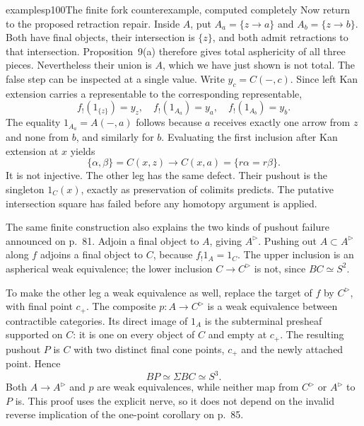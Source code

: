 \begin{dcomment}{examples}{p100}{The finite fork counterexample, computed completely}
Now return to the proposed retraction repair. Inside $A$, put $A_a=\{z\to a\}$ and $A_b=\{z\to b\}$. Both have final objects, their intersection is $\{z\}$, and both admit retractions to that intersection. Proposition~9(a) therefore gives total asphericity of all three pieces. Nevertheless their union is $A$, which we have just shown is not total. The false step can be inspected at a single value. Write $y_c=C(-,c)$. Since left Kan extension carries a representable to the corresponding representable,
\[
f_!(1_{\{z\}})=y_z,\quad
f_!(1_{A_a})=y_a,\quad
f_!(1_{A_b})=y_b.
\]
The equality $1_{A_a}=A(-,a)$ follows because $a$ receives exactly one arrow from $z$ and none from $b$, and similarly for $b$. Evaluating the first inclusion after Kan extension at $x$ yields
\[
\{\alpha,\beta\}=C(x,z)\longrightarrow C(x,a)=\{r\alpha=r\beta\}.
\]
It is not injective. The other leg has the same defect. Their pushout is the singleton $1_C(x)$, exactly as preservation of colimits predicts. The putative intersection square has failed before any homotopy argument is applied.

The same finite construction also explains the two kinds of pushout failure announced on p.~81. Adjoin a final object to $A$, giving $A^{\triangleright}$. Pushing out $A\subset A^{\triangleright}$ along $f$ adjoins a final object to $C$, because $f_!1_A=1_C$. The upper inclusion is an aspherical weak equivalence; the lower inclusion $C\to C^{\triangleright}$ is not, since $BC\simeq S^2$.

To make the other leg a weak equivalence as well, replace the target of $f$ by $C^{\triangleright}$, with final point $c_+$. The composite $p:A\to C^{\triangleright}$ is a weak equivalence between contractible categories. Its direct image of $1_A$ is the subterminal presheaf supported on $C$: it is one on every object of $C$ and empty at $c_+$. The resulting pushout $P$ is $C$ with two distinct final cone points, $c_+$ and the newly attached point. Hence
\[
BP\simeq\Sigma BC\simeq S^3.
\]
Both $A\to A^{\triangleright}$ and $p$ are weak equivalences, while neither map from $C^{\triangleright}$ or $A^{\triangleright}$ to $P$ is. This proof uses the explicit nerve, so it does not depend on the invalid reverse implication of the one-point corollary on p.~85.
\end{dcomment}


